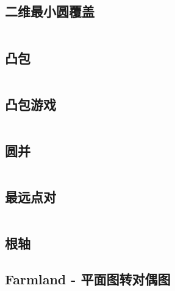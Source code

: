 \subsection{二维最小圆覆盖}
\inputminted[breaklines]{cpp}{./computational_geometry/2D-minimum-circle-coverage.cpp}
\subsection{凸包}
\inputminted[breaklines]{cpp}{./computational_geometry/convex_hull.cpp}
\subsection{凸包游戏}
\inputminted[breaklines]{cpp}{./computational_geometry/convex_hull_game.cpp}
\subsection{圆并}
\inputminted[breaklines]{cpp}{./computational_geometry/circle_union.cpp}
\subsection{最远点对}
\inputminted[breaklines]{cpp}{./computational_geometry/farthest_point_pair.cpp}
\subsection{根轴}

\subsection{Farmland - 平面图转对偶图}
\inputminted[breaklines]{cpp}{./computational_geometry/Farmland.cpp}